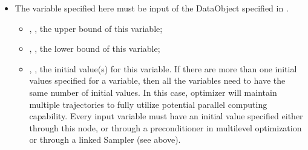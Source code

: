 \begin{itemize}
\item \variableDescription
 The variable specified here must be input of the DataObject specified in .
 \variableChildrenIntro
 \begin{itemize}
    \item {}, , the upper bound of this variable;
    \item {}, , the lower bound of this variable;
    \item {}, , the initial value(s) for this variable. If there are more
    than one initial values specified for a variable, then all the variables need to have the same number of initial values. In this case,
     optimizer will maintain multiple trajectories to fully utilize potential parallel computing capability.
    Every input variable must have an initial value specified either through this node, or through a
    preconditioner in multilevel optimization or through a linked Sampler (see above).
  \end{itemize}
\end{itemize}
\constantVariablesDescription
